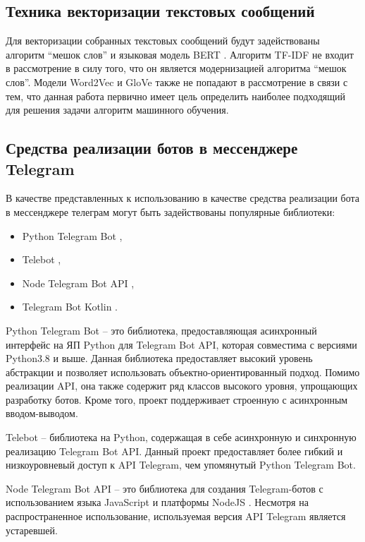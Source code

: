 \subsection{Техника векторизации текстовых сообщений}

Для векторизации собранных текстовых сообщений будут задействованы алгоритм ``мешок слов'' и языковая модель BERT \cite{bert}. Алгоритм TF-IDF не входит в рассмотрение в силу того, что он является модернизацией алгоритма ``мешок слов''. Модели Word2Vec \cite{word2vec} и GloVe \cite{glove} также не попадают в рассмотрение в связи с тем, что данная работа первично имеет цель определить наиболее подходящий для решения задачи алгоритм машинного обучения.

\subsection{Средства реализации ботов в мессенджере Telegram}

В качестве представленных к использованию в качестве средства реализации бота в мессенджере телеграм могут быть задействованы популярные библиотеки:

\begin{itemize}
	\item Python Telegram Bot \cite{pythonTelegram},
	\item Telebot \cite{telebot},
	\item Node Telegram Bot API \cite{nodeTelegram},
	\item Telegram Bot Kotlin \cite{kotlinTelegram}.
\end{itemize}

Python Telegram Bot -- это библиотека, предоставляющая асинхронный интерфейс на ЯП Python для Telegram Bot API, которая совместима с версиями Python3.8 \cite{Python} и выше. Данная библиотека предоставляет высокий уровень абстракции и позволяет использовать объектно-ориентированный подход. Помимо реализации API, она также содержит ряд классов высокого уровня, упрощающих разработку ботов. Кроме того, проект поддерживает строенную с асинхронным вводом-выводом. \cite{pythonTelegram}

Telebot -- библиотека на Python, содержащая в себе асинхронную и синхронную реализацию Telegram Bot API. Данный проект предоставляет более гибкий и низкоуровневый доступ к API Telegram, чем упомянутый Python Telegram Bot. \cite{telebot}

Node Telegram Bot API -- это библиотека для создания Telegram-ботов с использованием языка JavaScript \cite{js} и платформы NodeJS \cite{nodejs}. Несмотря на распространенное использование, используемая версия API Telegram является устаревшей. \cite{nodeTelegram}

